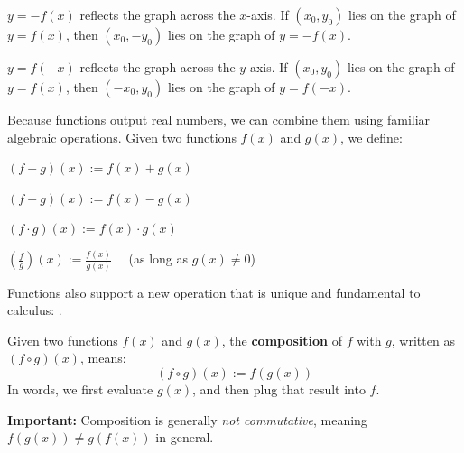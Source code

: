 \begin{dfn}
\begin{description}[style=nextline]
  \item[Reflection across \( x \)-axis:] 
  \( y = -f(x) \) reflects the graph across the \( x \)-axis.  
  If \( (x_0, y_0) \) lies on the graph of \( y = f(x) \), then \( (x_0, -y_0) \) lies on the graph of \( y = -f(x) \).

  \item[Reflection across \( y \)-axis:] 
  \( y = f(-x) \) reflects the graph across the \( y \)-axis.  
  If \( (x_0, y_0) \) lies on the graph of \( y = f(x) \), then \( (-x_0, y_0) \) lies on the graph of \( y = f(-x) \).


\end{description}
\end{dfn}

\begin{dfn}
Because functions output real numbers, we can combine them using familiar algebraic operations. Given two functions \( f(x) \) and \( g(x) \), we define:

\begin{description}[style=nextline, leftmargin=3.2cm]

  \item[Addition:] 
  \( (f + g)(x) := f(x) + g(x) \)

  \item[Subtraction:] 
  \( (f - g)(x) := f(x) - g(x) \)

  \item[Multiplication:] 
  \( (f \cdot g)(x) := f(x) \cdot g(x) \)

  \item[Division:] 
  \( \left( \frac{f}{g} \right)(x) := \frac{f(x)}{g(x)} \quad \) (as long as \( g(x) \ne 0 \))

\end{description}
\end{dfn}

\vspace{1em}

Functions also support a new operation that is unique and fundamental to calculus: .

\begin{dfn}
Given two functions \( f(x) \) and \( g(x) \), the \textbf{composition} of \( f \) with \( g \), written as \( (f \circ g)(x) \), means:
\[
(f \circ g)(x) := f(g(x))
\]
In words, we first evaluate \( g(x) \), and then plug that result into \( f \).

\vspace{0.5em}
\textbf{Important:} Composition is generally \emph{not commutative}, meaning \( f(g(x)) \ne g(f(x)) \) in general.
\end{dfn}

